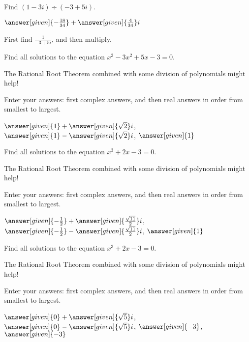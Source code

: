 \documentclass[nooutcomes]{ximera}
\begin{document}
\begin{problem}
Find $(1-3i) \div (-3+5i)$.
\begin{prompt}
	$\answer[given]{-\frac{18}{34}} + \answer[given]{\frac{4}{34}}i$
\end{prompt}
\begin{hint}
First find $\frac{1}{-3+5i}$, and then multiply.
\end{hint}
\end{problem}



\begin{problem}
Find all solutions to the equation $x^3-3x^2+5x-3=0$. 
\begin{hint} 
The Rational Root Theorem combined with some division of polynomials might help!
\end{hint}
Enter your answers: first complex answers, and then real answers in order from smallest to largest.

\begin{prompt}
$\answer[given]{1} + \answer[given]{\sqrt{2}}i$, $\answer[given]{1} - \answer[given]{\sqrt{2}}i$, $\answer[given]{1}$
\end{prompt}
\end{problem}


\begin{problem}
Find all solutions to the equation $x^3+2x-3=0$. 
\begin{hint} 
The Rational Root Theorem combined with some division of polynomials might help!
\end{hint}
Enter your answers: first complex answers, and then real answers in order from smallest to largest.

\begin{prompt}
$\answer[given]{-\frac{1}{2}} + \answer[given]{\frac{\sqrt{11}}{2}}i$, $\answer[given]{-\frac{1}{2}} - \answer[given]{\frac{\sqrt{11}}{2}}i$, $\answer[given]{1}$
\end{prompt}
\end{problem}


\begin{problem}
Find all solutions to the equation $x^3+2x-3=0$. 
\begin{hint} 
The Rational Root Theorem combined with some division of polynomials might help!
\end{hint}
Enter your answers: first complex answers, and then real answers in order from smallest to largest.

\begin{prompt}
$\answer[given]{0} + \answer[given]{\sqrt{5}}i$, $\answer[given]{0} - \answer[given]{\sqrt{5}}i$, $\answer[given]{-3}$, $\answer[given]{-3}$
\end{prompt}
\end{problem}
\end{document}
